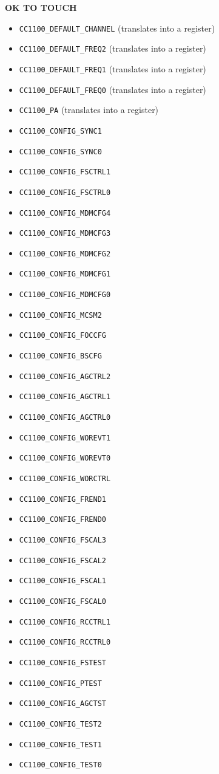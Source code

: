 \documentclass{article}
\begin{document}
\begin{center}
\textbf{OK TO TOUCH}
\begin{itemize}
	\item \texttt{CC1100\_DEFAULT\_CHANNEL} (translates into a register)
	\item \texttt{CC1100\_DEFAULT\_FREQ2} (translates into a register)
	\item \texttt{CC1100\_DEFAULT\_FREQ1} (translates into a register)
	\item \texttt{CC1100\_DEFAULT\_FREQ0} (translates into a register)
	\item \texttt{CC1100\_PA} (translates into a register)
	\item \texttt{CC1100\_CONFIG\_SYNC1}
	\item \texttt{CC1100\_CONFIG\_SYNC0}
	\item \texttt{CC1100\_CONFIG\_FSCTRL1}
	\item \texttt{CC1100\_CONFIG\_FSCTRL0}
	\item \texttt{CC1100\_CONFIG\_MDMCFG4}
	\item \texttt{CC1100\_CONFIG\_MDMCFG3}
	\item \texttt{CC1100\_CONFIG\_MDMCFG2}
	\item \texttt{CC1100\_CONFIG\_MDMCFG1}
	\item \texttt{CC1100\_CONFIG\_MDMCFG0}
	\item \texttt{CC1100\_CONFIG\_MCSM2}
	\item \texttt{CC1100\_CONFIG\_FOCCFG}
	\item \texttt{CC1100\_CONFIG\_BSCFG}
	\item \texttt{CC1100\_CONFIG\_AGCTRL2}
	\item \texttt{CC1100\_CONFIG\_AGCTRL1}
	\item \texttt{CC1100\_CONFIG\_AGCTRL0}
	\item \texttt{CC1100\_CONFIG\_WOREVT1}
	\item \texttt{CC1100\_CONFIG\_WOREVT0}
	\item \texttt{CC1100\_CONFIG\_WORCTRL}
	\item \texttt{CC1100\_CONFIG\_FREND1}
	\item \texttt{CC1100\_CONFIG\_FREND0}
	\item \texttt{CC1100\_CONFIG\_FSCAL3}
	\item \texttt{CC1100\_CONFIG\_FSCAL2}
	\item \texttt{CC1100\_CONFIG\_FSCAL1}
	\item \texttt{CC1100\_CONFIG\_FSCAL0}
	\item \texttt{CC1100\_CONFIG\_RCCTRL1}
	\item \texttt{CC1100\_CONFIG\_RCCTRL0}
	\item \texttt{CC1100\_CONFIG\_FSTEST}
	\item \texttt{CC1100\_CONFIG\_PTEST}
	\item \texttt{CC1100\_CONFIG\_AGCTST}
	\item \texttt{CC1100\_CONFIG\_TEST2}
	\item \texttt{CC1100\_CONFIG\_TEST1}
	\item \texttt{CC1100\_CONFIG\_TEST0}
\end{itemize}
\end{center}
\end{document}
